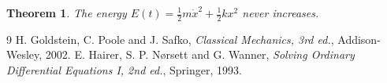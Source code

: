 \documentclass[11pt,a4paper]{article}
\newtheorem{theorem}{Theorem}
\begin{document}
\begin{theorem}
  The energy $E(t)=\frac{1}{2}m\dot{x}^{2}+\frac{1}{2}kx^{2}$ never increases.
\end{theorem}

\begin{thebibliography}{9}
 H. Goldstein, C. Poole and J. Safko, \emph{Classical Mechanics, 3rd ed.}, Addison-Wesley, 2002.
 E. Hairer, S. P. Nørsett and G. Wanner, \emph{Solving Ordinary Differential Equations I, 2nd ed.}, Springer, 1993.
\end{thebibliography}
\end{document}
